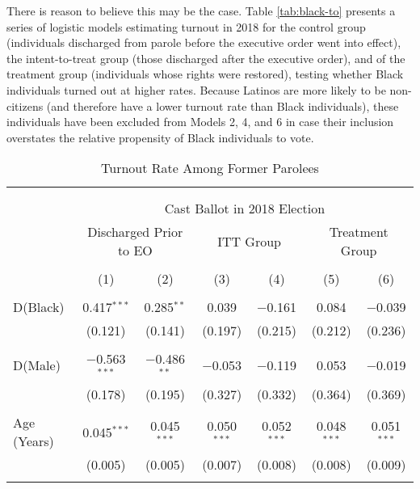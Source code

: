 \documentclass[
  12pt,
]{article}
\begin{document}
There is reason to believe this may be the case. Table \ref{tab:black-to} presents a series of logistic models estimating turnout in 2018 for the control group (individuals discharged from parole before the executive order went into effect), the intent-to-treat group (those discharged after the executive order), and of the treatment group (individuals whose rights were restored), testing whether Black individuals turned out at higher rates. Because Latinos are more likely to be non-citizens (and therefore have a lower turnout rate than Black individuals), these individuals have been excluded from Models 2, 4, and 6 in case their inclusion overstates the relative propensity of Black individuals to vote.

\begin{singlespace}
\begin{table}[H] \centering
\fontsize{10}{12}\selectfont
\caption{\label{tab:black-to} Turnout Rate Among Former Parolees}
\label{}
\begin{tabular}{@{\extracolsep{5pt}}lcccccc}
\\[-1.8ex]\hline \\[-1.8ex]
\\[-1.8ex] & \multicolumn{6}{c}{Cast Ballot in 2018 Election} \\
& \multicolumn{2}{c}{Discharged Prior to EO} & \multicolumn{2}{c}{ITT Group} & \multicolumn{2}{c}{Treatment Group} \\
\cmidrule(l{3pt}r{3pt}){2-3} \cmidrule(l{3pt}r{3pt}){4-5}  \cmidrule(l{3pt}r{3pt}){6-7}
\\[-1.8ex] & (1) & (2) & (3) & (4) & (5) & (6)\\
\hline \\[-1.8ex]
D(Black) & 0.417$^{***}$ & 0.285$^{**}$ & 0.039 & $-$0.161 & 0.084 & $-$0.039 \\
& (0.121) & (0.141) & (0.197) & (0.215) & (0.212) & (0.236) \\
& & & & & & \\
D(Male) & $-$0.563$^{***}$ & $-$0.486$^{**}$ & $-$0.053 & $-$0.119 & 0.053 & $-$0.019 \\
& (0.178) & (0.195) & (0.327) & (0.332) & (0.364) & (0.369) \\
& & & & & & \\
Age (Years) & 0.045$^{***}$ & 0.045$^{***}$ & 0.050$^{***}$ & 0.052$^{***}$ & 0.048$^{***}$ & 0.051$^{***}$ \\
& (0.005) & (0.005) & (0.007) & (0.008) & (0.008) & (0.009) \\
& & & & & & \\

\end{tabular}
\end{table}
\end{singlespace}
\end{document}
